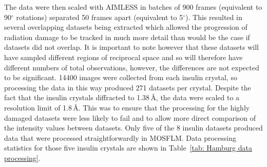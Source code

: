 The data were then scaled with AIMLESS \cite{evans2013} in batches of 900 frames (equivalent to 90$^{\circ}$ rotations) separated 50 frames apart (equivalent to 5$^{\circ}$).
This resulted in several overlapping datasets being extracted which allowed the progression of radiation damage to be tracked in much more detail than would be the case if datasets did not overlap.
It is important to note however that these datasets will have sampled different regions of reciprocal space and so will therefore have different numbers of total observations, however, the differences are not expected to be significant.
14400 images were collected from each insulin crystal, so processing the data in this way produced 271 datasets per crystal.
Despite the fact that the insulin crystals diffracted to 1.38$\,$\AA, the data were scaled to a resolution limit of 1.8$\,$\AA.
This was to ensure that the processing for the highly damaged datasets were less likely to fail and to allow more direct comparison of the intensity values between datasets.
Only five of the 8 insulin datasets produced data that were processed straightforwardly in MOSFLM.
Data processing statistics for those five insulin crystals are shown in Table~\ref{tab: Hamburg data processing}.

